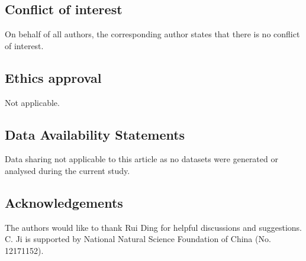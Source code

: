 \documentclass[11pt]{amsart}
\numberwithin{equation}{section}
\begin{document}
\subsection*{Conflict of interest}

On behalf of all authors, the corresponding author states that there is no conflict of interest.

\subsection*{Ethics approval}
 Not applicable.

\subsection*{Data Availability Statements}
Data sharing not applicable to this article as no datasets were generated or analysed during the current study.

\subsection*{Acknowledgements}
The authors would like to thank Rui Ding for helpful discussions and suggestions. C. Ji is supported by National Natural Science Foundation of China (No. 12171152).
\end{document}
